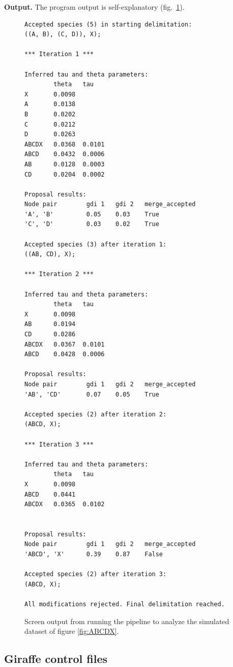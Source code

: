 \documentclass[A4]{article1}
\begin{document}
\textbf{Output.}  The program output is self-explanatory (fig.~\ref{fig:ABCDX-output}).

\begin{figure}
    \centering
    \footnotesize
    
    \begin{verbatim}
Accepted species (5) in starting delimitation:
((A, B), (C, D)), X);

*** Iteration 1 ***

Inferred tau and theta parameters:
        theta   tau
X       0.0098	
A       0.0138	
B       0.0202	
C       0.0212	
D       0.0263	
ABCDX   0.0368  0.0101
ABCD    0.0432  0.0006
AB      0.0128  0.0003
CD      0.0204  0.0002

Proposal results:
Node pair        gdi 1   gdi 2   merge_accepted
'A', 'B'         0.05    0.03    True
'C', 'D'         0.03    0.02    True

Accepted species (3) after iteration 1:
((AB, CD), X);

*** Iteration 2 ***

Inferred tau and theta parameters:
        theta   tau
X       0.0098	
AB      0.0194	
CD      0.0286	
ABCDX   0.0367  0.0101
ABCD    0.0428  0.0006

Proposal results:
Node pair        gdi 1   gdi 2   merge_accepted
'AB', 'CD'       0.07    0.05    True 

Accepted species (2) after iteration 2:
(ABCD, X);

*** Iteration 3 ***

Inferred tau and theta parameters:
        theta   tau
X       0.0098
ABCD    0.0441	
ABCDX   0.0365  0.0102


Proposal results:
Node pair        gdi 1   gdi 2   merge_accepted
'ABCD', 'X'      0.39    0.87    False

Accepted species (2) after iteration 3:
(ABCD, X);

All modifications rejected. Final delimitation reached.
    \end{verbatim}
    
    \caption{Screen output from running the pipeline to analyze the simulated dataset of
        figure \ref{fig:ABCDX}. %
    } \label{fig:ABCDX-output}
\end{figure}

\clearpage
\newpage
\subsection{Giraffe control files}
\end{document}
